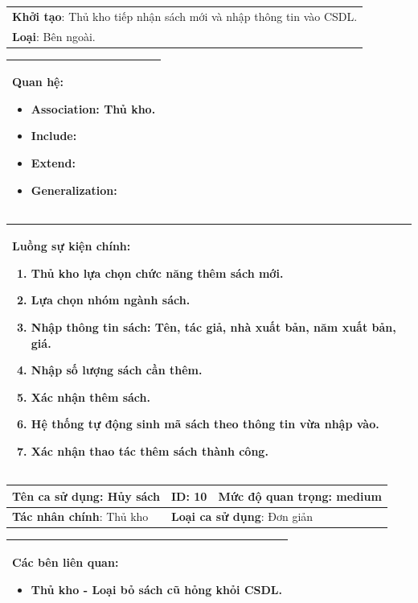 \documentclass[12pt]{report}
\begin{document}
\begin{center}
\begin{tabular}{| m{15.9cm} |}
    \hline
    \textbf{Khởi tạo}: Thủ kho tiếp nhận sách mới và nhập thông tin vào CSDL. \\
    \textbf{Loại}: Bên ngoài.  \\
    \hline
\end{tabular}

\begin{tabular}{| m{15.9cm} |}
    \hline
    \textbf{Quan hệ}:
    \begin{itemize}
        \item Association: Thủ kho. 
        \item Include: 
        \item Extend: 
        \item Generalization: 
    \end{itemize} \\
    \hline
\end{tabular}

\begin{tabular}{| m{15.9cm} |}
    \hline
    \textbf{Luồng sự kiện chính}:
    \begin{enumerate}
        \item Thủ kho lựa chọn chức năng thêm sách mới. 
        \item Lựa chọn nhóm ngành sách. 
        \item Nhập thông tin sách: Tên, tác giả, nhà xuất bản, năm xuất bản, giá. 
        \item Nhập số lượng sách cần thêm. 
        \item Xác nhận thêm sách. 
        \item Hệ thống tự động sinh mã sách theo thông tin vừa nhập vào. 
        \item Xác nhận thao tác thêm sách thành công. 
    \end{enumerate} \\
    \hline
\end{tabular}

\newpage
\begin{tabular}{| m{6cm} | m{3cm} | m{6cm} |}
    \hline
    \textbf{Tên ca sử dụng}: Hủy sách & \textbf{ID}: 10 & \textbf{Mức độ quan trọng}: medium \\
    \hline
    \textbf{Tác nhân chính}: Thủ kho  & \multicolumn{2}{|l|}{\textbf{Loại ca sử dụng}: Đơn giản} \\
    \hline
\end{tabular}
\begin{tabular}{| m{15.9cm} |}
    \hline
        \textbf{Các bên liên quan:} 
        \begin{itemize}
            \item Thủ kho - Loại bỏ sách cũ hỏng khỏi CSDL. 
        \end{itemize} \\
    \hline
\end{tabular}


\end{center}
\end{document}

